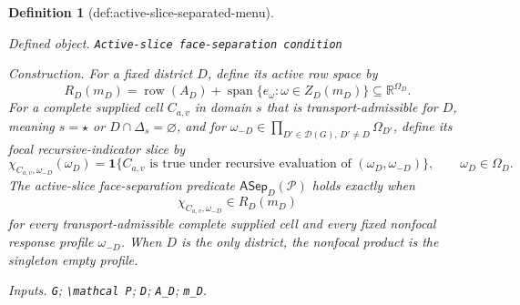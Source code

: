 \documentclass{article}
\newtheorem{definition}{Definition}
\begin{document}
\begin{definition}[def:active-slice-separated-menu]\label{def:active-slice-separated-menu}
\par\smallskip\noindent\emph{Defined object.} \texttt{Active-\allowbreak{}slice face-\allowbreak{}separation condition}
\par\smallskip\noindent\emph{Construction.} For a fixed district \(D\), define its active row space by
\[
R_D(m_D)=\operatorname{row}(A_D)+
\operatorname{span}\{e_\omega:\omega\in Z_D(m_D)\}
\subseteq\mathbb R^{\Omega_D}.
\]
For a complete supplied cell \(C_{a,v}\) in domain \(s\) that is transport-admissible for \(D\), meaning \(s=\star\) or \(D\cap\Delta_s=\varnothing\), and for
\(\omega_{-D}\in\prod_{D'\in\mathcal D(G),\,D'\ne D}\Omega_{D'}\), define its focal recursive-indicator slice by
\[
\chi_{C_{a,v},\omega_{-D}}(\omega_D)
=\mathbf 1\{C_{a,v}\text{ is true under recursive evaluation of }
(\omega_D,\omega_{-D})\},
\qquad \omega_D\in\Omega_D.
\]
The active-slice face-separation predicate \(\mathsf{ASep}_D(\mathcal P)\) holds exactly when
\[
\chi_{C_{a,v},\omega_{-D}}\in R_D(m_D)
\]
for every transport-admissible complete supplied cell and every fixed nonfocal response profile \(\omega_{-D}\).  When \(D\) is the only district, the nonfocal product is the singleton empty profile.
\par\smallskip\noindent\emph{Inputs.} \texttt{G}; \texttt{\textbackslash{}\allowbreak{}mathcal P}; \texttt{D}; \texttt{A\_\allowbreak{}D}; \texttt{m\_\allowbreak{}D}.
\end{definition}
\end{document}

